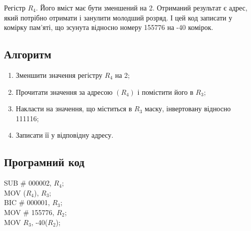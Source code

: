 Регістр $R_4$. Його вміст має бути зменшений на 2. Отриманий результат є адрес, який потрібно отримати і занулити молодший розряд. І цей код записати у комірку пам’яті, що зсунута відносно номеру 155776 на -40 комірок.
\subsection{Алгоритм}
\begin{enumerate}
\item Зменшити значення регістру $R_4$ на 2;
\item Прочитати значення за адресою $(R_4)$ і помістити його в $R_3$;
\item Накласти на значення, що міститься в $R_3$ маску, інвертовану відносно 111116;
\item Записати її у відповідну адресу.
\end{enumerate}
\subsection{Програмний код}
\begin{listing}
SUB \# 000002, $R_4$; \\
MOV ($R_4$), $R_3$; \\
BIC \# 000001, $R_3$; \\
MOV \# 155776, $R_2$; \\
MOV $R_3$, -40($R_2$); \\
\end{listing}
